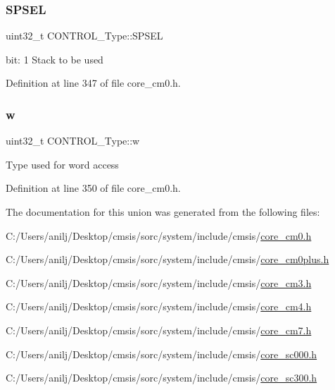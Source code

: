 \subsubsection{\texorpdfstring{S\+P\+S\+EL}{SPSEL}}
{\footnotesize\ttfamily uint32\+\_\+t C\+O\+N\+T\+R\+O\+L\+\_\+\+Type\+::\+S\+P\+S\+EL}

bit\+: 1 Stack to be used 

Definition at line 347 of file core\+\_\+cm0.\+h.

\mbox{\label{union_c_o_n_t_r_o_l___type_a6b642cca3d96da660b1198c133ca2a1f}} 
\subsubsection{\texorpdfstring{w}{w}}
{\footnotesize\ttfamily uint32\+\_\+t C\+O\+N\+T\+R\+O\+L\+\_\+\+Type\+::w}

Type used for word access 

Definition at line 350 of file core\+\_\+cm0.\+h.



The documentation for this union was generated from the following files\+:\begin{DoxyCompactItemize}
\item 
C\+:/\+Users/anilj/\+Desktop/cmsis/sorc/system/include/cmsis/\hyperlink{core__cm0_8h}{core\+\_\+cm0.\+h}\item 
C\+:/\+Users/anilj/\+Desktop/cmsis/sorc/system/include/cmsis/\hyperlink{core__cm0plus_8h}{core\+\_\+cm0plus.\+h}\item 
C\+:/\+Users/anilj/\+Desktop/cmsis/sorc/system/include/cmsis/\hyperlink{core__cm3_8h}{core\+\_\+cm3.\+h}\item 
C\+:/\+Users/anilj/\+Desktop/cmsis/sorc/system/include/cmsis/\hyperlink{core__cm4_8h}{core\+\_\+cm4.\+h}\item 
C\+:/\+Users/anilj/\+Desktop/cmsis/sorc/system/include/cmsis/\hyperlink{core__cm7_8h}{core\+\_\+cm7.\+h}\item 
C\+:/\+Users/anilj/\+Desktop/cmsis/sorc/system/include/cmsis/\hyperlink{core__sc000_8h}{core\+\_\+sc000.\+h}\item 
C\+:/\+Users/anilj/\+Desktop/cmsis/sorc/system/include/cmsis/\hyperlink{core__sc300_8h}{core\+\_\+sc300.\+h}\end{DoxyCompactItemize}
